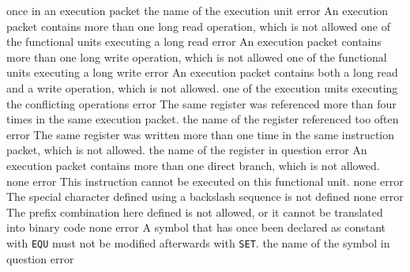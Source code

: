 \documentclass[12pt,twoside]{report}
\begin{document}
\begin{description}
{                once in an execution packet}
               {the name of the execution unit}
               {error}
               {An execution packet contains more than one long read
                operation, which is not allowed}
               {one of the functional units executing a long read}
               {error}
               {An execution packet contains more than one long write
                operation, which is not allowed}
               {one of the functional units executing a long write}
               {error}
               {An execution packet contains both a long read and a write
                operation, which is not allowed.}
               {one of the execution units executing the conflicting
                operations}
               {error}
               {The same register was referenced more than four times in
                the same execution packet.}
               {the name of the register referenced too often}
               {error}
               {The same register was written more than one time in the
                same instruction packet, which is not allowed.}
               {the name of the register in question}
               {error}
               {An execution packet contains more than one direct branch,
                which is not allowed.}
               {none}
               {error}
               {This instruction cannot be executed on this functional
                unit.}
               {none}
               {error}
               {The special character defined using a backslash sequence
                is not defined}
               {none}
               {error}
               {The prefix combination here defined is not allowed, or it
                cannot be translated into binary code}
               {none}
               {error}
               {A symbol that has once been declared as constant with
                {\tt EQU} must not be modified afterwards with {\tt SET}.}
               {the name of the symbol in question}
               {error}

\end{description}
\end{document}
